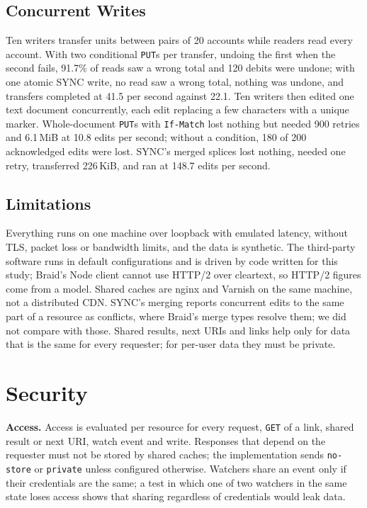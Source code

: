 \documentclass[11pt,a4paper]{article}
\begin{document}
\subsection{Concurrent Writes}

Ten writers transfer units between pairs of 20 accounts while readers read every account. With two conditional \texttt{PUT}s per transfer, undoing the first when the second fails, 91.7\% of reads saw a wrong total and 120 debits were undone; with one atomic SYNC write, no read saw a wrong total, nothing was undone, and transfers completed at 41.5 per second against 22.1. Ten writers then edited one text document concurrently, each edit replacing a few characters with a unique marker. Whole-document \texttt{PUT}s with \texttt{If-Match} lost nothing but needed 900 retries and 6.1\,MiB at 10.8 edits per second; without a condition, 180 of 200 acknowledged edits were lost. SYNC's merged splices lost nothing, needed one retry, transferred 226\,KiB, and ran at 148.7 edits per second.

\subsection{Limitations}

Everything runs on one machine over loopback with emulated latency, without TLS, packet loss or bandwidth limits, and the data is synthetic. The third-party software runs in default configurations and is driven by code written for this study; Braid's Node client cannot use HTTP/2 over cleartext, so HTTP/2 figures come from a model. Shared caches are nginx and Varnish on the same machine, not a distributed CDN. SYNC's merging reports concurrent edits to the same part of a resource as conflicts, where Braid's merge types resolve them; we did not compare with those. Shared results, next URIs and links help only for data that is the same for every requester; for per-user data they must be private.

\section{Security}
\label{sec:security}

\textbf{Access.} Access is evaluated per resource for every request, \texttt{GET} of a link, shared result or next URI, watch event and write. Responses that depend on the requester must not be stored by shared caches; the implementation sends \texttt{no-store} or \texttt{private} unless configured otherwise. Watchers share an event only if their credentials are the same; a test in which one of two watchers in the same state loses access shows that sharing regardless of credentials would leak data.
\end{document}
